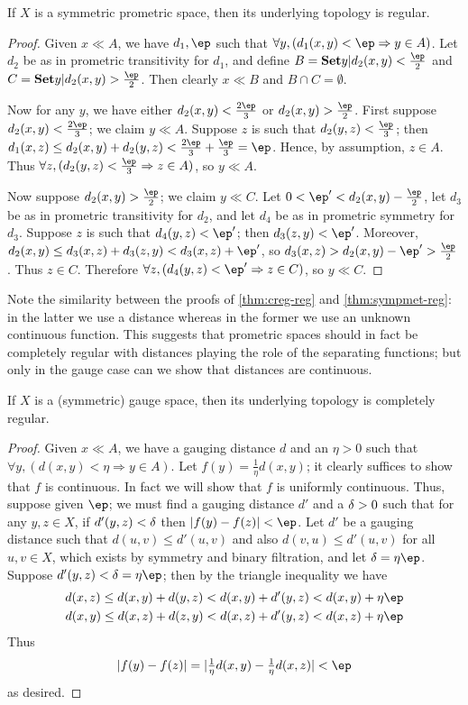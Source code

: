 \documentclass{article}
\let\implies\Rightarrow
\def\hfep{\frac{\ep}{2}}
\begin{document}
\begin{thm}\label{thm:sympmet-reg}
  If $X$ is a symmetric prometric space, then its underlying topology is regular.
\end{thm}
\begin{proof}
  Given $x\ll A$, we have $d_1,\ep$ such that $\forall y, (d_1(x,y)<\ep \implies y\in A)$.
  Let $d_2$ be as in prometric transitivity for $d_1$, and define $B = \setof{y|d_2(x,y)<\hfep}$ and $C = \setof{y|d_2(x,y)>\hfep}$.
  Then clearly $x\ll B$ and $B\cap C = \emptyset$.

  Now for any $y$, we have either $d_2(x,y)<\frac{2\ep}3$ or $d_2(x,y)>\hfep$.
  First suppose $d_2(x,y)<\frac{2\ep}3$; we claim $y\ll A$.
  Suppose $z$ is such that $d_2(y,z)<\frac{\ep}{3}$; then $d_1(x,z) \le d_2(x,y)+d_2(y,z) < \frac{2\ep}{3} + \frac{\ep}{3} = \ep$.
  Hence, by assumption, $z\in A$.
  Thus $\forall z, (d_2(y,z)<\frac{\ep}{3} \implies z\in A)$, so $y\ll A$.

  Now suppose $d_2(x,y)>\hfep$; we claim $y\ll C$.
  Let $0<\ep' < d_2(x,y)-\hfep$, let $d_3$ be as in prometric transitivity for $d_2$, and let $d_4$ be as in prometric symmetry for $d_3$.
  Suppose $z$ is such that $d_4(y,z)<\ep'$; then $d_3(z,y)<\ep'$.
  Moreover, $d_2(x,y) \le d_3(x,z) + d_3(z,y) < d_3(x,z) + \ep'$, so $d_3(x,z) > d_2(x,y) - \ep' > \hfep$.
  Thus $z\in C$.
  Therefore $\forall z, (d_4(y,z)<\ep' \implies z\in C)$, so $y\ll C$.
\end{proof}

Note the similarity between the proofs of \cref{thm:creg-reg} and \cref{thm:sympmet-reg}: in the latter we use a distance whereas in the former we use an unknown continuous function.
This suggests that prometric spaces should in fact be completely regular with distances playing the role of the separating functions; but only in the gauge case can we show that distances are continuous.

\begin{thm}\label{thm:symgauge-creg}
  If $X$ is a (symmetric) gauge space, then its underlying topology is completely regular.
\end{thm}
\begin{proof}
  Given $x\ll A$, we have a gauging distance $d$ and an $\eta>0$ such that $\forall y, (d(x,y)<\eta \implies y\in A)$.
  Let $f(y) = \frac1{\eta} d(x,y)$; it clearly suffices to show that $f$ is continuous.
  In fact we will show that $f$ is uniformly continuous.
  Thus, suppose given $\ep$; we must find a gauging distance $d'$ and a $\delta>0$ such that for any $y,z\in X$, if $d'(y,z)<\delta$ then $|f(y)-f(z)|<\ep$.
  Let $d'$ be a gauging distance such that $d(u,v)\le d'(u,v)$ and also $d(v,u) \le d'(u,v)$ for all $u,v\in X$, which exists by symmetry and binary filtration, and let $\de = \eta\ep$.
  Suppose $d'(y,z)< \de= \eta\ep$; then by the triangle inequality we have
  \begin{gather*}
    d(x,z) \le d(x,y)+d(y,z) < d(x,y) + d'(y,z) < d(x,y)+\eta\ep\\
    d(x,y) \le d(x,z)+d(z,y) < d(x,z) + d'(y,z) < d(x,z)+\eta\ep
  \end{gather*}
  Thus
  \[ |f(y)-f(z)| = |\textstyle\frac1{\eta}d(x,y) - \frac1{\eta}d(x,z)| < \ep \]
  as desired.
\end{proof}
\end{document}
